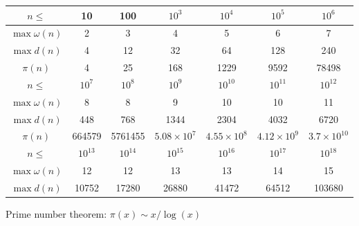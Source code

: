 \begin{table}[H]
	\centering
	\begin{tabular}{c c c c c c c}
		\toprule
		\( n \leq \)       & 10          & 100         & \(10^3\)            & \(10^4\)            & \(10^5\)            & \(10^6\)              \\
		\midrule
		\(\max \omega(n)\) & 2           & 3           & 4                   & 5                   & 6                   & 7                     \\
		\(\max d(n)\)      & 4           & 12          & 32                  & 64                  & 128                 & 240                   \\
		\(\pi(n)\)         & 4           & 25          & 168                 & 1229                & 9592                & 78498                 \\
		\midrule
		\( n \leq \)       & \(10^7\)    & \(10^8\)    & \(10^9\)            & \(10^{10}\)         & \(10^{11}\)         & \(10^{12}\)           \\
		\midrule
		\(\max \omega(n)\) & 8           & 8           & 9                   & 10                  & 10                  & 11                    \\
		\(\max d(n)\)      & 448         & 768         & 1344                & 2304                & 4032                & 6720                  \\
		\(\pi(n)\)         & 664579      & 5761455     & \(5.08\times 10^7\) & \(4.55\times 10^8\) & \(4.12\times 10^9\) & \(3.7\times 10^{10}\) \\
		\midrule
		\( n \leq \)       & \(10^{13}\) & \(10^{14}\) & \(10^{15}\)         & \(10^{16}\)         & \(10^{17}\)         & \(10^{18}\)           \\
		\midrule
		\(\max \omega(n)\) & 12          & 12          & 13                  & 13                  & 14                  & 15                    \\
		\(\max d(n)\)      & 10752       & 17280       & 26880               & 41472               & 64512               & 103680                \\
		\bottomrule
	\end{tabular}
\end{table}

Prime number theorem: \(\pi(x) \sim x/\log(x)\)
